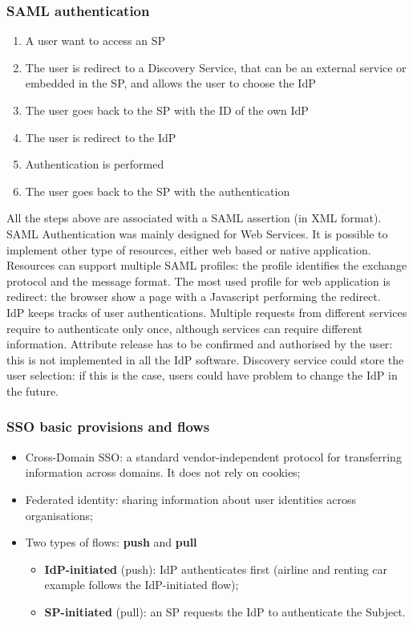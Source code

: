 \documentclass[a4paper, 10pt, titlepage]{article}
\begin{document}
\subsubsection{SAML authentication}
\begin{enumerate}
\item A user want to access an SP
\item The user is redirect to a Discovery Service, that can be an external service or embedded in the SP, and allows the user to choose the IdP
\item The user goes back to the SP with the ID of the own IdP
\item The user is redirect to the IdP
\item Authentication is performed
\item The user goes back to the SP with the authentication
\end{enumerate}
All the steps above are associated with a SAML assertion (in XML format). SAML Authentication was mainly designed for Web Services. It is possible to implement other type of resources, either web based or native application. Resources can support multiple SAML profiles: the profile identifies the exchange protocol and the message format. The most used profile for web application is redirect: the browser show a page with a Javascript performing the redirect. \medskip\\
IdP keeps tracks of user authentications. Multiple requests from different services require to authenticate only once, although services can require different information. Attribute release has to be confirmed and authorised by the user: this is not implemented in all the IdP software. Discovery service could store the user selection: if this is the case, users could have problem to change the IdP in the future.

\subsubsection{SSO basic provisions and flows}
\begin{itemize}
\item Cross-Domain SSO: a standard vendor-independent protocol for transferring information across domains. It does not rely on cookies;
\item Federated identity: sharing information about user identities across organisations;
\item Two types of flows: \textbf{push} and \textbf{pull}
	\begin{itemize}
	\item \textbf{IdP-initiated} (push): IdP authenticates first (airline and renting car example follows the IdP-initiated flow);
	\item \textbf{SP-initiated} (pull): an SP requests the IdP to authenticate the Subject.
	\end{itemize}
\end{itemize}
\end{document}
